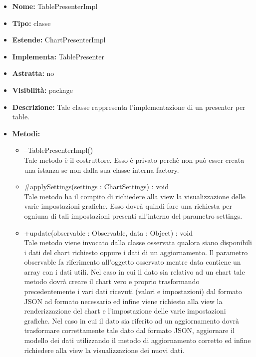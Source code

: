 			
			\begin{itemize}
			\item \textbf{Nome:} TablePresenterImpl
			\item \textbf{Tipo:} classe
			
		\item \textbf{Estende:}
		ChartPresenterImpl
		\item \textbf{Implementa:}
		TablePresenter
		\item \textbf{Astratta:}
		no
			\item \textbf{Visibilità:} package
			\item \textbf{Descrizione:} Tale classe rappresenta l'implementazione di un presenter per table.
			\item \textbf{Metodi:}
				\begin{itemize}
				\setlength{\itemsep}{5pt}
				
					\item[\ding{111}] {{--TablePresenterImpl()}} \\ [1mm] Tale metodo è il costruttore. Esso è privato perchè non può esser creata una istanza se non dalla sua classe interna factory.
					\item[\ding{111}] {{\#applySettings(settings : ChartSettings) : void}} \\ [1mm] Tale metodo ha il compito di richiedere alla view la visualizzazione delle varie impostazioni grafiche. Esso dovrà quindi fare una richiesta per ogniuna di tali impostazioni presenti all'interno del parametro settings.
					\item[\ding{111}] {{+update(observable : Observable, data : Object) : void}} \\ [1mm] Tale metodo viene invocato dalla classe osservata qualora siano disponibili i dati del chart richiesto oppure i dati di un aggiornamento. Il parametro observable fa riferimento all'oggetto osservato mentre data contiene un array con i dati utili. Nel caso in cui il dato sia relativo ad un chart tale metodo dovrà creare il chart vero e proprio trasformando precedentemente i vari dati ricevuti (valori e impostazioni) dal formato JSON ad formato necessario ed infine viene richiesto alla view la renderizzazione del chart e l'impostazione delle varie impostazioni grafiche. Nel caso in cui il dato sia riferito ad un aggiornamento dovrà trasformare correttamente tale dato dal formato JSON, aggiornare il modello dei dati utilizzando il metodo di aggiornamento corretto ed infine richiedere alla view la visualizzazione dei nuovi dati.
				\end{itemize}
		
			\end{itemize}

